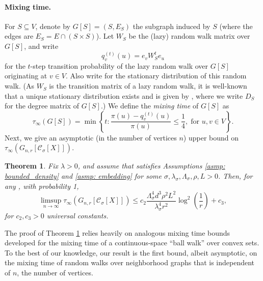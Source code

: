 \documentclass[11pt,twoside]{article}
\newtheorem{theorem}{Theorem}
\newcommand{\set}[1]{\left\{#1\right\}}
\newcommand{\vol}{\mathrm{vol}}
\newcommand{\1}{\mathbf{1}}
\newcommand{\Xbf}{X}             %
\newcommand{\Wbf}{W}
\newcommand{\Dbf}{D}
\newcommand{\Cbb}{\mathbb{C}}
\newcommand{\Cset}{\mathcal{C}}
\newcommand{\Csig}{\Cset_{\sigma}}
\begin{document}
\paragraph{Mixing time.} For $S \subseteq V$, denote by $G[S] = (S, E_S)$ the
subgraph induced by $S$ (where the edges are $E_S = E \cap (S \times S)$). Let
$\Wbf_S$ be the (lazy) random walk matrix over $G[S]$, and write  
$$
q_{v}^{(t)}(u) = e_v\Wbf_S^t e_u
$$
for the $t$-step transition probability of the lazy random walk over $G[S]$
originating at $v \in V$. Also write 
for the stationary distribution of this random walk.  (As
$\Wbf_S$ is the transition matrix of a lazy random walk, 
it is well-known that a unique stationary distribution exists and is given by 
\smash{$\pi(u) = (\Dbf_S)_{uu}/\vol(S; G[S])$}, where we write $\Dbf_S$ for the  
degree matrix of $G[S]$.) We define the \emph{mixing time} of $G[S]$ as
\begin{equation}
\label{eqn: mixing_time}
\tau_{\infty}(G[S]) = \min\set{ t: \frac{\pi(u) - q_{v}^{(t)}(u)}
  {\pi(u)} \leq \frac{1}{4}, \; \text{for $u,v \in V$}}. 
\end{equation}
Next, we give an asymptotic (in the number of vertices $n$) upper bound on
$\tau_{\infty}(G_{n,r}[\Csig[\Xbf]])$.  

\begin{theorem}
  \label{thm: mixing_time_upper_bound}
  Fix $\lambda > 0$, and assume that \smash{$\Cset \in \Cbb_f(\lambda)$}
  satisfies Assumptions \ref{asmp: bounded_density} and \ref{asmp: embedding}
  for some $\sigma, \lambda_{\sigma}, \Lambda_{\sigma}, \rho, L > 0$. Then, for
  any , with probability 1,
  \begin{equation} 
    \label{eqn: mixing_time_upper_bound}
    \limsup_{n \to \infty}\tau_{\infty}(G_{n,r}[\Csig[\Xbf]]) \leq c_2
    \frac{\Lambda_{\sigma}^4 d^3 \rho^2 L^2}{\lambda_{\sigma}^4 r^2}
    \log^2\left(\frac{1}{r}\right) + c_3,
  \end{equation}
  for $c_2,c_3 > 0$ universal constants. 
\end{theorem}

The proof of Theorem \ref{thm: mixing_time_upper_bound} relies heavily on
analogous mixing time bounds developed for the mixing time of a
continuous-space ``ball walk'' over convex sets. To the best of our knowledge, our
result is the first bound, albeit asymptotic, on the mixing time of random walks
over neighborhood graphs that is independent of $n$, the number of vertices.   
\end{document}
